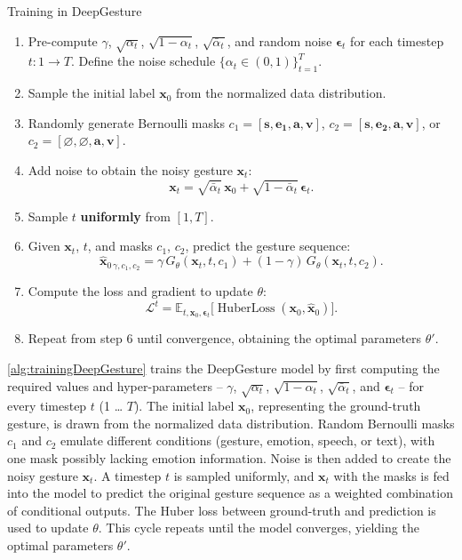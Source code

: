 \begin{algorithm}[h]
	\caption{Training in DeepGesture}
	\label{alg:trainingDeepGesture}
	\setlength{\baselineskip}{10pt}
	\begin{enumerate}
		\item Pre-compute $\gamma$, $\sqrt{\alpha_t}$, $\sqrt{1-\alpha_t}$, $\sqrt{\bar{\alpha}_t}$, and random noise $\boldsymbol{\epsilon}_t$ for each timestep $t: 1 \rightarrow T$. Define the noise schedule $\{\alpha_t \in (0,1)\}_{t=1}^T$.
		\item Sample the initial label $\mathbf{x}_0$ from the normalized data distribution.
		\item Randomly generate Bernoulli masks
		$c_{1} = [ \mathbf{s}, \mathbf{e_1}, \mathbf{a}, \mathbf{v} ]$,
		$c_{2} = [ \mathbf{s}, \mathbf{e_2}, \mathbf{a}, \mathbf{v} ]$, or
		$c_{2} = [ \varnothing, \varnothing, \mathbf{a}, \mathbf{v} ]$.
		\item Add noise to obtain the noisy gesture $\mathbf{x}_t$:
		\[
		\mathbf{x}_t = \sqrt{\bar{\alpha}_t}\,\mathbf{x}_0 + \sqrt{1-\bar{\alpha}_t}\,\boldsymbol{\epsilon}_t.
		\]
		\item Sample $t$ \textbf{uniformly} from $[1, T]$.
		\item Given $\mathbf{x}_t$, $t$, and masks $c_1$, $c_2$, predict the gesture sequence:
		\[
		\hat{\mathbf{x}}_{0\,\gamma,c_{1},c_{2}}
		= \gamma\, G_{\theta}(\mathbf{x}_{t}, t, c_{1})
		+ (1-\gamma)\, G_{\theta}(\mathbf{x}_{t}, t, c_{2}).
		\]
		\item Compute the loss and gradient to update $\theta$:
		\[
		\mathcal{L}^t
		= \mathbb{E}_{t, \mathbf{x}_0, \boldsymbol{\epsilon}_t}
		\bigl[\operatorname{HuberLoss}(\mathbf{x}_0, \hat{\mathbf{x}}_0)\bigr].
		\]
		\item Repeat from step 6 until convergence, obtaining the optimal parameters $\theta'$.
	\end{enumerate}
\end{algorithm}

\autoref{alg:trainingDeepGesture} trains the DeepGesture model by first computing the required values and hyper-parameters -- 	$\gamma$, $\sqrt{\alpha_t}$, $\sqrt{1-\alpha_t}$, $\sqrt{\bar{\alpha}_t}$, and $\boldsymbol{\epsilon}_t$ -- for every timestep $t$ (1 … $T$).  
The initial label $\mathbf{x}_0$, representing the ground-truth gesture, is drawn from the normalized data distribution.  
Random Bernoulli masks $c_1$ and $c_2$ emulate different conditions (gesture, emotion, speech, or text), with one mask possibly lacking emotion information.  
Noise is then added to create the noisy gesture $\mathbf{x}_t$.  
A timestep $t$ is sampled uniformly, and $\mathbf{x}_t$ with the masks is fed into the model to predict the original gesture sequence as a weighted combination of conditional outputs.  
The Huber loss between ground-truth and prediction is used to update $\theta$.  
This cycle repeats until the model converges, yielding the optimal parameters $\theta'$.

